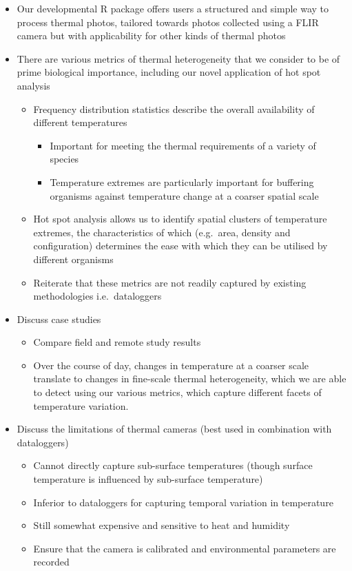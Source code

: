 \documentclass[12pt,a4paper,]{report}
\providecommand{\tightlist}{%
  \setlength{\itemsep}{0pt}\setlength{\parskip}{0pt}}
\theoremstyle{definition}
\theoremstyle{definition}
\theoremstyle{definition}
\theoremstyle{remark}
\begin{document}
\begin{itemize}
\tightlist
\item
  Our developmental R package offers users a structured and simple way
  to process thermal photos, tailored towards photos collected using a
  FLIR camera but with applicability for other kinds of thermal photos
\item
  There are various metrics of thermal heterogeneity that we consider to
  be of prime biological importance, including our novel application of
  hot spot analysis

  \begin{itemize}
  \tightlist
  \item
    Frequency distribution statistics describe the overall availability
    of different temperatures

    \begin{itemize}
    \tightlist
    \item
      Important for meeting the thermal requirements of a variety of
      species
    \item
      Temperature extremes are particularly important for buffering
      organisms against temperature change at a coarser spatial scale
    \end{itemize}
  \item
    Hot spot analysis allows us to identify spatial clusters of
    temperature extremes, the characteristics of which (e.g.~area,
    density and configuration) determines the ease with which they can
    be utilised by different organisms
  \item
    Reiterate that these metrics are not readily captured by existing
    methodologies i.e.~dataloggers
  \end{itemize}
\item
  Discuss case studies

  \begin{itemize}
  \tightlist
  \item
    Compare field and remote study results
  \item
    Over the course of day, changes in temperature at a coarser scale
    translate to changes in fine-scale thermal heterogeneity, which we
    are able to detect using our various metrics, which capture
    different facets of temperature variation.
  \end{itemize}
\item
  Discuss the limitations of thermal cameras (best used in combination
  with dataloggers)

  \begin{itemize}
  \tightlist
  \item
    Cannot directly capture sub-surface temperatures (though surface
    temperature is influenced by sub-surface temperature)
  \item
    Inferior to dataloggers for capturing temporal variation in
    temperature
  \item
    Still somewhat expensive and sensitive to heat and humidity
  \item
    Ensure that the camera is calibrated and environmental parameters
    are recorded
  \end{itemize}
\end{itemize}
\end{document}
